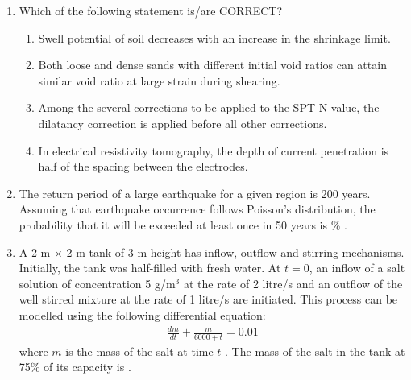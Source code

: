 \documentclass[journal,12pt,onecolumn]{article}
\theoremstyle{remark}
\begin{document}
\begin{enumerate}
    \item Which of the following statement is/are CORRECT?
    
    \hfill{}
    \begin{enumerate}
        \item Swell potential of soil decreases with an increase in the shrinkage limit.
        \item Both loose and dense sands with different initial void ratios can attain similar void ratio at large strain during shearing.
        \item Among the several corrections to be applied to the SPT-N value, the dilatancy correction is applied before all other corrections.
        \item In electrical resistivity tomography, the depth of current penetration is half of the spacing between the electrodes.
    \end{enumerate}
    
    \item The return period of a large earthquake for a given region is 200 years. Assuming that earthquake occurrence follows Poisson's distribution, the probability that it will be exceeded at least once in 50 years is \underline{\hspace{2cm}} \% .
    
    \hfill{}
    
    \item A 2 m $\times$ 2 m tank of 3 m height has inflow, outflow and stirring mechanisms. Initially, the tank was half-filled with fresh water. At $t = 0$, an inflow of a salt solution of concentration 5 g/m$^3$ at the rate of 2 litre/s and an outflow of the well stirred mixture at the rate of 1 litre/s are initiated. This process can be modelled using the following differential equation:
    \begin{align}
    \frac{dm}{dt} + \frac{m}{6000 + t} = 0.01
    \end{align}
    where $m$ is the mass  of the salt at time $t$ . The mass of the salt  in the tank at 75\% of its capacity is \underline{\hspace{2cm}} .
    
    \hfill{}
    

\end{enumerate}
\end{document}
